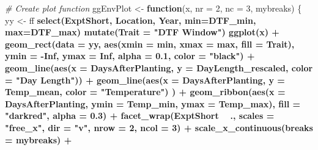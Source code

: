 \documentclass[
]{article}
\newenvironment{Shaded}{\begin{snugshade}}{\end{snugshade}}
\newcommand{\CommentTok}[1]{\textcolor[rgb]{0.56,0.35,0.01}{\textit{#1}}}
\newcommand{\ControlFlowTok}[1]{\textcolor[rgb]{0.13,0.29,0.53}{\textbf{#1}}}
\newcommand{\DataTypeTok}[1]{\textcolor[rgb]{0.13,0.29,0.53}{#1}}
\newcommand{\DecValTok}[1]{\textcolor[rgb]{0.00,0.00,0.81}{#1}}
\newcommand{\FloatTok}[1]{\textcolor[rgb]{0.00,0.00,0.81}{#1}}
\newcommand{\KeywordTok}[1]{\textcolor[rgb]{0.13,0.29,0.53}{\textbf{#1}}}
\newcommand{\NormalTok}[1]{#1}
\newcommand{\OperatorTok}[1]{\textcolor[rgb]{0.81,0.36,0.00}{\textbf{#1}}}
\newcommand{\OtherTok}[1]{\textcolor[rgb]{0.56,0.35,0.01}{#1}}
\newcommand{\StringTok}[1]{\textcolor[rgb]{0.31,0.60,0.02}{#1}}
\begin{document}
\begin{Shaded}
\begin{Highlighting}[]
\CommentTok{# Create plot function}
\NormalTok{ggEnvPlot <-}\StringTok{ }\ControlFlowTok{function}\NormalTok{(x, }\DataTypeTok{nr =} \DecValTok{2}\NormalTok{, }\DataTypeTok{nc =} \DecValTok{3}\NormalTok{, mybreaks) \{}
\NormalTok{  yy <-}\StringTok{ }\NormalTok{ff }\OperatorTok{%
\StringTok{    }\KeywordTok{select}\NormalTok{(ExptShort, Location, Year, }\DataTypeTok{min=}\NormalTok{DTF_min, }\DataTypeTok{max=}\NormalTok{DTF_max) }\OperatorTok{%
\StringTok{    }\KeywordTok{mutate}\NormalTok{(}\DataTypeTok{Trait =} \StringTok{"DTF Window"}\NormalTok{)}
  \KeywordTok{ggplot}\NormalTok{(x) }\OperatorTok{+}
\StringTok{    }\KeywordTok{geom_rect}\NormalTok{(}\DataTypeTok{data =}\NormalTok{ yy, }\KeywordTok{aes}\NormalTok{(}\DataTypeTok{xmin =}\NormalTok{ min, }\DataTypeTok{xmax =}\NormalTok{ max, }\DataTypeTok{fill =}\NormalTok{ Trait),   }
              \DataTypeTok{ymin =} \OperatorTok{-}\OtherTok{Inf}\NormalTok{, }\DataTypeTok{ymax =} \OtherTok{Inf}\NormalTok{, }\DataTypeTok{alpha =} \FloatTok{0.1}\NormalTok{, }\DataTypeTok{color =} \StringTok{"black"}\NormalTok{) }\OperatorTok{+}
\StringTok{    }\KeywordTok{geom_line}\NormalTok{(}\KeywordTok{aes}\NormalTok{(}\DataTypeTok{x =}\NormalTok{ DaysAfterPlanting, }\DataTypeTok{y =}\NormalTok{ DayLength_rescaled, }\DataTypeTok{color =} \StringTok{"Day Length"}\NormalTok{)) }\OperatorTok{+}
\StringTok{    }\KeywordTok{geom_line}\NormalTok{(}\KeywordTok{aes}\NormalTok{(}\DataTypeTok{x =}\NormalTok{ DaysAfterPlanting, }\DataTypeTok{y =}\NormalTok{ Temp_mean, }\DataTypeTok{color =} \StringTok{"Temperature"}\NormalTok{) ) }\OperatorTok{+}
\StringTok{    }\KeywordTok{geom_ribbon}\NormalTok{(}\KeywordTok{aes}\NormalTok{(}\DataTypeTok{x =}\NormalTok{ DaysAfterPlanting, }\DataTypeTok{ymin =}\NormalTok{ Temp_min, }\DataTypeTok{ymax =}\NormalTok{ Temp_max),}
                \DataTypeTok{fill =} \StringTok{"darkred"}\NormalTok{, }\DataTypeTok{alpha =} \FloatTok{0.3}\NormalTok{) }\OperatorTok{+}
\StringTok{    }\KeywordTok{facet_wrap}\NormalTok{(ExptShort }\OperatorTok{~}\StringTok{ }\NormalTok{., }\DataTypeTok{scales =} \StringTok{"free_x"}\NormalTok{, }\DataTypeTok{dir =} \StringTok{"v"}\NormalTok{, }\DataTypeTok{nrow =} \DecValTok{2}\NormalTok{, }\DataTypeTok{ncol =} \DecValTok{3}\NormalTok{) }\OperatorTok{+}
\StringTok{    }\KeywordTok{scale_x_continuous}\NormalTok{(}\DataTypeTok{breaks =}\NormalTok{ mybreaks) }\OperatorTok{+}
}}
\end{Highlighting}
\end{Shaded}
\end{document}
